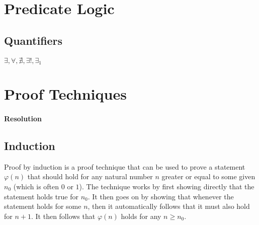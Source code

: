\section{Predicate Logic}



\subsection{Quantifiers}

$\exists, \forall, \nexists, \exists!, \exists_1$




\section{Proof Techniques}







\paragraph{Resolution}


\subsection{Induction}
Proof by induction is a proof technique that can be used to prove a statement $\varphi(n)$ that should hold for any natural number $n$ greater or equal to some given $n_0$ (which is often $0$ or $1$). The technique works by first showing directly that the statement holds true for $n_0$. It then goes on by showing that whenever the statement holds for some $n$, then it automatically follows that it must also hold for $n+1$. It then follows that $\varphi(n)$ holds for any $n \geq n_0$.

